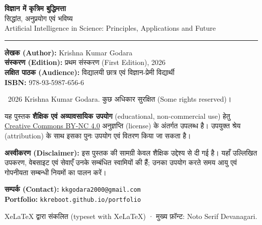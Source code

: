 \thispagestyle{empty}
\vspace*{\fill}
\noindent
{\sffamily\bfseries\large\color{aiblue} विज्ञान में कृत्रिम बुद्धिमत्ता}\\[2pt]
{\sffamily\color{aigrey} सिद्धांत, अनुप्रयोग एवं भविष्य}\\[1pt]
{\sffamily\footnotesize\color{aigrey} Artificial Intelligence in Science: Principles, Applications and Future}

\medskip
\noindent\rule{\linewidth}{0.4pt}

\medskip
\noindent
\textbf{लेखक (Author):} Krishna Kumar Godara\\
\textbf{संस्करण (Edition):} प्रथम संस्करण (First Edition), 2026\\
\textbf{लक्षित पाठक (Audience):} विद्यालयी छात्र एवं विज्ञान-प्रेमी विद्यार्थी\\
\textbf{ISBN:} 978-93-5987-656-6

\medskip
\noindent
\textcopyright~2026 Krishna Kumar Godara. कुछ अधिकार सुरक्षित (Some rights reserved)।

\medskip
\noindent
यह पुस्तक \textbf{शैक्षिक एवं अव्यावसायिक उपयोग} (educational, non-commercial use)
हेतु \href{https://creativecommons.org/licenses/by-nc/4.0/}{Creative Commons
BY-NC 4.0} अनुज्ञप्ति (license) के अंतर्गत उपलब्ध है। उपयुक्त श्रेय (attribution)
के साथ इसका पुनः उपयोग एवं वितरण किया जा सकता है।

\medskip
\noindent
\textbf{अस्वीकरण (Disclaimer):} इस पुस्तक की सामग्री केवल शैक्षिक उद्देश्य से दी गई है।
यहाँ उल्लिखित उपकरण, वेबसाइट एवं सेवाएँ उनके सम्बंधित स्वामियों की हैं; उनका उपयोग
करते समय आयु एवं गोपनीयता सम्बन्धी नियमों का पालन करें।

\medskip
\noindent
\textbf{सम्पर्क (Contact):} \texttt{kkgodara2000@gmail.com}\\
\textbf{Portfolio:} \texttt{kkreboot.github.io/portfolio}

\medskip
\noindent
{\footnotesize\color{aigrey} XeLaTeX द्वारा संकलित (typeset with XeLaTeX) ·
मुख्य फ़ॉन्ट: Noto Serif Devanagari.}
\vspace*{\fill}
\cleardoublepage
